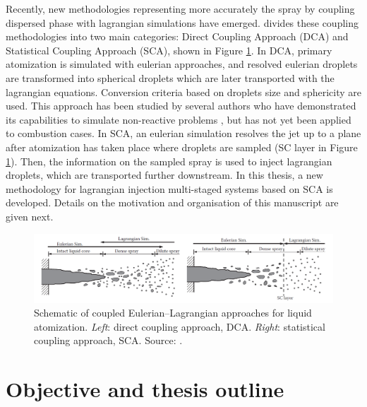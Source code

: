 Recently, new methodologies representing more accurately the spray by coupling dispersed phase with lagrangian simulations have emerged.  divides these coupling methodologies into two main categories: Direct Coupling Approach (DCA) and Statistical Coupling Approach (SCA), shown in Figure \ref{fig:coupled_EE_EL_approaches_Michaelides}. In DCA, primary atomization is simulated with eulerian approaches, and resolved eulerian droplets are transformed into spherical droplets which are later transported with the lagrangian equations. Conversion criteria based on droplets size and sphericity are used. This approach has been studied by several authors who have demonstrated its capabilities to simulate non-reactive problems , but has not yet been applied to combustion cases. In SCA, an eulerian simulation resolves the jet up to a plane after atomization has taken place where droplets are sampled (SC layer in Figure \ref{fig:coupled_EE_EL_approaches_Michaelides}). Then, the information on the sampled spray is used to inject lagrangian droplets, which are transported further downstream. In this thesis, a new methodology for lagrangian injection multi-staged systems based on SCA is developed. Details on the motivation and organisation of this manuscript are given next.

\begin{figure}[h!]
	\centering
   \includegraphics[scale=0.5]{./part0_intro/coupled_EE_EL_approaches_Michaelides}
	\caption[Schematic of coupled Eulerian–Lagrangian approaches for liquid atomization.]{Schematic of coupled Eulerian–Lagrangian approaches for liquid atomization. \textsl{Left}: direct coupling approach, DCA. \textsl{Right}: statistical coupling approach, SCA. Source: .}
	\label{fig:coupled_EE_EL_approaches_Michaelides}
\end{figure}

\clearpage

\section{Objective and thesis outline}
\label{sec:ch1_objective_thesis_outline}

